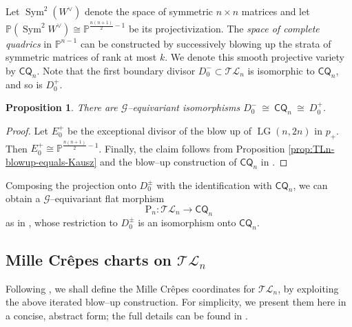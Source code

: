 \documentclass[10pt]{amsart}
\newtheorem{proposition}[theorem]{Proposition}
\theoremstyle{definition}
\newcommand{\LG}{\operatorname{LG}}
\newcommand{\CQ}{\mathsf{CQ}}
\DeclareMathOperator{\Sym}{Sym}
\newcommand{\TL}{\mathcal{TL}}
\newcommand{\PP}{\mathbb{P}}
\newcommand{\PL}{\mathrm{P}}
\theoremstyle{plain} %
\begin{document}

Let $\Sym^2(W^\vee)$ denote the space of symmetric $n\times n$ matrices and let $\PP(\Sym^2 W^\vee) \cong \PP^{\frac{n(n+1)}2-1}$ be its projectivization. The \emph{space of complete quadrics} in $\PP^{n-1}$ can be constructed by successively blowing up the strata of symmetric matrices of rank at most $k$. We denote this smooth projective variety by $\CQ_n$. Note that the first boundary divisor $D_0^-\subset\TL_n$ is isomorphic to $\CQ_n$, and so is $D_0^+$.

\begin{proposition}\label{prop:D1-MLn}
There are $\mathscr G$--equivariant isomorphisms $D_0^- \ \cong\ \CQ_n \ \cong\ D_0^+$.
\end{proposition}
\begin{proof}
Let $E_0^{+}$ be the exceptional divisor of the blow up of $\LG(n,2n)$ in $p_{+}$. Then $E_{0}^{+}\cong \mathbb{P}^{\frac{n(n+1)}{2}-1}$. Finally, the claim follows from Proposition \ref{prop:TLn-blowup-equals-Kausz} and the blow--up construction of $\CQ_n$ in \cite{Va2}.
\end{proof}

Composing the projection onto $D_0^{\pm}$ with the identification with $\CQ_n$, we can obtain a $\mathscr G$--equivariant flat morphism 
\begin{equation}
\PL_n \colon \TL_n \longrightarrow \CQ_n
\end{equation}
as in \cite{FW}, whose restriction to $D_0^{\pm}$ is an isomorphism onto $\CQ_n$.

\subsection*{Mille Cr\^epes charts on \texorpdfstring{$\TL_n$}{TL\_n}}
\label{subsec:mille-crepes}
Following \cite[Section~3]{FW}, we shall define the Mille Crêpes coordinates for $\TL_n$, by exploiting the above iterated blow--up construction.  For simplicity, we present them here in a concise, abstract form; the full details can be found in \cite{FMW}. %
\end{document}
